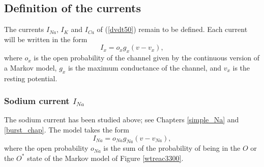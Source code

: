 
\subsection{Definition of the currents}

The currents $I_{Na},\, I_K$ and $I_{Ca}$ of (\ref{dvdt50}) remain to be defined. Each current will be written in the form
\[
I_x=o_x g_x (v-v_x),
\]
where  $o_x$ is the open probability of the channel given by the continuous version of a Markov model, $g_x$ is the maximum conductance of the channel, and $v_x$ is the resting potential.

\subsubsection{Sodium current $I_{Na}$}

The sodium current has been studied above; see Chapters \ref{simple_Na} and \ref{burst_chap}. The model takes the form
\begin{equation}
I_{Na}= o_{Na} g_{Na}(v-v_{Na}),   \label{J_Na}
\end{equation}
where the open probability $o_{Na}$ is the sum of the probability of being in the $O$ or the $O^*$ state of the Markov model of Figure  \ref{wtreac3300}.

